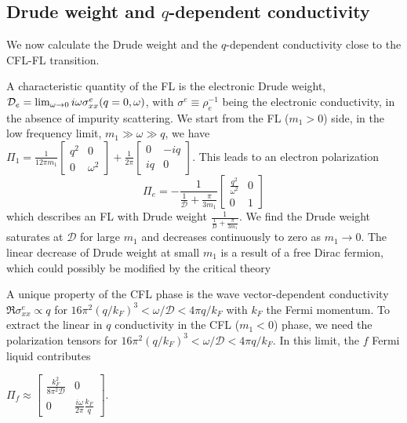 \documentclass[aps,prl,twocolumn,superscriptaddress,floatfix, 10pt,longbibliography, nofootinbib]{revtex4-2}
\begin{document}
\subsection{Drude weight and $q$-dependent conductivity}
We now calculate the Drude weight and the $q$-dependent conductivity close to the CFL-FL transition.


 A characteristic quantity of the FL is the electronic Drude weight, ${\cal D}_e=\lim_{\omega\rightarrow 0}i\omega\sigma^e_{xx}(q=0,\omega)$, with $\sigma^e\equiv \rho_e^{-1}$ being the electronic conductivity, in the absence of impurity scattering. We start from the FL ($m_1>0$) side, in the low frequency limit, $m_1\gg \omega\gg q$, we have $\Pi_{1}=\frac{1}{12\pi m_1}\begin{bmatrix}
    q^2 & 0\\
    0& \omega^2
    \end{bmatrix}+\frac{1}{2\pi}\begin{bmatrix}
    0 & -iq\\
    iq& 0
    \end{bmatrix}.$
This leads to an electron polarization
\begin{equation}
    \Pi_{e}=-\frac{1}{\frac{1}{\mathcal{D}}+\frac{\pi}{3m_1}}\begin{bmatrix}
    \frac{q^2}{\omega^2} & 0\\
    0 & 1
    \end{bmatrix}
    \label{drudeweight_FL}
\end{equation}
which describes an FL with Drude weight $\frac{1}{\frac{1}{D}+\frac{\pi}{3m_1}}$. We find the Drude weight saturates at $\mathcal D$ for large $m_1$ and decreases continuously to zero as $m_1\rightarrow 0$. The linear decrease of Drude weight at small $m_1$ is a result of a free Dirac fermion, which could possibly be modified by the critical theory

A unique property of the CFL phase is the wave vector-dependent conductivity $\Re\sigma^e_{xx}\propto q$ for ${16\pi^2 }(q/k_F)^3<\omega/\mathcal{D}<4 \pi q/k_F$ with $k_F$ the Fermi momentum.
To extract the linear in $q$ conductivity in the CFL ($m_1<0$) phase, we need the polarization tensors for ${16\pi^2 }(q/k_F)^3<\omega/\mathcal{D}<4 \pi q/k_F$. In this limit, the $f$ Fermi liquid contributes






$\Pi_{f}\approx \begin{bmatrix}
    \frac{k_F^2}{8\pi^2 \mathcal{D}} & 0\\
    0& \frac{i\omega}{2\pi}\frac{k_F}{q}
    \end{bmatrix}. $
\end{document}

